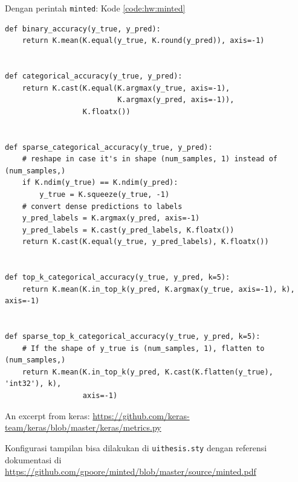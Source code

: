     Dengan perintah \verb|minted|: Kode \ref{code:hw:minted}
    \begin{listing}[H]
        \begin{verbatim}
def binary_accuracy(y_true, y_pred):
    return K.mean(K.equal(y_true, K.round(y_pred)), axis=-1)


def categorical_accuracy(y_true, y_pred):
    return K.cast(K.equal(K.argmax(y_true, axis=-1),
                          K.argmax(y_pred, axis=-1)),
                  K.floatx())


def sparse_categorical_accuracy(y_true, y_pred):
    # reshape in case it's in shape (num_samples, 1) instead of (num_samples,)
    if K.ndim(y_true) == K.ndim(y_pred):
        y_true = K.squeeze(y_true, -1)
    # convert dense predictions to labels
    y_pred_labels = K.argmax(y_pred, axis=-1)
    y_pred_labels = K.cast(y_pred_labels, K.floatx())
    return K.cast(K.equal(y_true, y_pred_labels), K.floatx())


def top_k_categorical_accuracy(y_true, y_pred, k=5):
    return K.mean(K.in_top_k(y_pred, K.argmax(y_true, axis=-1), k), axis=-1)


def sparse_top_k_categorical_accuracy(y_true, y_pred, k=5):
    # If the shape of y_true is (num_samples, 1), flatten to (num_samples,)
    return K.mean(K.in_top_k(y_pred, K.cast(K.flatten(y_true), 'int32'), k),
                  axis=-1)
    \end{verbatim}
        \caption{An excerpt from keras: \url{https://github.com/keras-team/keras/blob/master/keras/metrics.py}}
        \label{code:hw:minted}
    \end{listing}

    Konfigurasi tampilan bisa dilakukan di \verb|uithesis.sty| dengan referensi dokumentasi di \url{https://github.com/gpoore/minted/blob/master/source/minted.pdf}

\fi